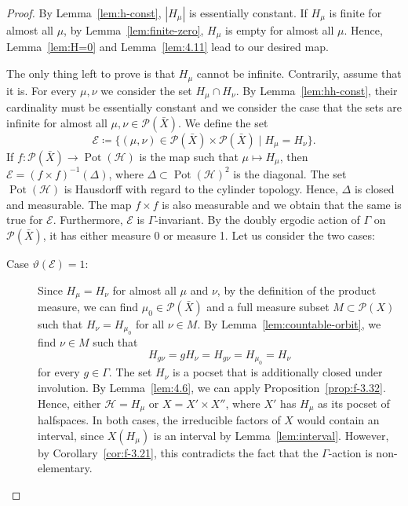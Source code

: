 \begin{proof}
  By Lemma~\ref{lem:h-const}, \(|H_\mu|\) is essentially constant.
  If \(H_\mu\) is finite for almost all \(\mu\), by Lemma~\ref{lem:finite-zero}, \(H_\mu\) is empty for almost all \(\mu\). Hence, Lemma~\ref{lem:H=0} and Lemma~\ref{lem:4.11} lead to our desired map.

  The only thing left to prove is that \(H_\mu\) cannot be infinite. Contrarily, assume that it is. For every \(\mu, \nu\) we consider the set \(H_\mu \cap H_\nu\). By Lemma~\ref{lem:hh-const}, their cardinality must be essentially constant and we consider the case that the sets are infinite for almost all \(\mu, \nu \in \mathcal{P}(\bar X)\).
  We define the set
  \[
    \mathcal{E} \coloneqq \{(\mu, \nu) \in \mathcal{P}(\bar X) \times \mathcal{P}(\bar X)\mid H_\mu = H_\nu\}.
  \]
  If \(f\colon \mathcal{P}(\bar X) \to \operatorname{Pot}(\mathcal{H})\) is the map such that  \(\mu \mapsto H_\mu\), then \(\mathcal{E} = (f \times f)^{-1}(\Delta)\), where \(\Delta \subset \operatorname{Pot}(\mathcal{H})^2\) is the diagonal. The set \(\operatorname{Pot}(\mathcal{H})\) is Hausdorff with regard to the cylinder topology. Hence, \(\Delta\) is closed and measurable. The map \(f \times f\) is also measurable and we obtain that the same is true for \(\mathcal{E}\). Furthermore, \(\mathcal{E}\) is \(\Gamma\)-invariant.  By the doubly ergodic action of \(\Gamma\) on \(\mathcal{P}(\bar X)\), it has either measure 0 or measure 1. Let us consider the two cases:
  \begin{description}
  \item[Case \(\vartheta(\mathcal{E})=1\):] Since \(H_\mu = H_\nu\) for almost all \(\mu\) and \(\nu\), by the definition of the product measure, we can find \(\mu_0 \in \mathcal{P}(\bar X)\) and a full measure subset \(M \subset \mathcal{P}(X)\) such that \(H_\nu = H_{\mu_0}\) for all \(\nu \in M\). By Lemma~\ref{lem:countable-orbit}, we find \(\nu \in M\) such that
    \[
      H_{g\nu} = gH_\nu = H_{g\nu} = H_{\mu_0} = H_\nu
    \]
    for every \(g \in \Gamma\). The set \(H_\nu\) is a pocset that is additionally closed under involution. By Lemma~\ref{lem:4.6}, we can apply Proposition~\ref{prop:f-3.32}. Hence, either \(\mathcal{H} = H_\mu\) or \(X = X' \times X''\), where \(X'\) has \(H_\mu\) as its pocset of halfspaces. In both cases, the irreducible factors of \(X\) would contain an interval, since \(X(H_\mu)\) is an interval by Lemma~\ref{lem:interval}. However, by Corollary~\ref{cor:f-3.21}, this contradicts the fact that the \(\Gamma\)-action is non-elementary.

\end{description}
\end{proof}

